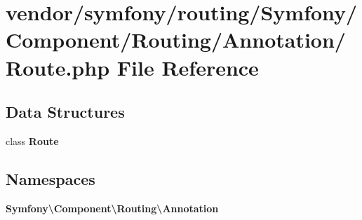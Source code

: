 \section{vendor/symfony/routing/\+Symfony/\+Component/\+Routing/\+Annotation/\+Route.php File Reference}
\label{symfony_2routing_2_symfony_2_component_2_routing_2_annotation_2_route_8php}
\subsection*{Data Structures}
\begin{DoxyCompactItemize}
\item 
class {\bf Route}
\end{DoxyCompactItemize}
\subsection*{Namespaces}
\begin{DoxyCompactItemize}
\item 
 {\bf Symfony\textbackslash{}\+Component\textbackslash{}\+Routing\textbackslash{}\+Annotation}
\end{DoxyCompactItemize}
